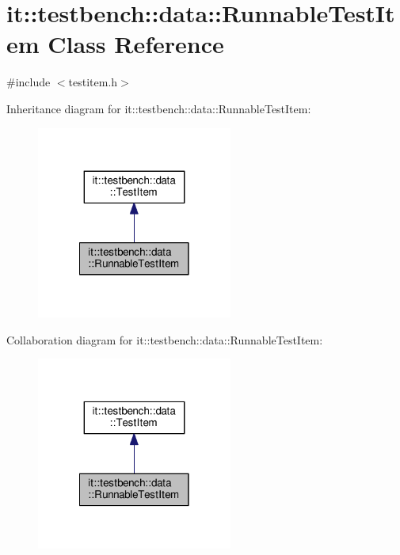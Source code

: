 \hypertarget{classit_1_1testbench_1_1data_1_1RunnableTestItem}{\section{it\-:\-:testbench\-:\-:data\-:\-:Runnable\-Test\-Item Class Reference}
\label{d0/df8/classit_1_1testbench_1_1data_1_1RunnableTestItem}
}


{\ttfamily \#include $<$testitem.\-h$>$}



Inheritance diagram for it\-:\-:testbench\-:\-:data\-:\-:Runnable\-Test\-Item\-:
\nopagebreak
\begin{figure}[H]
\begin{center}
\leavevmode
\includegraphics[width=182pt]{d1/d92/classit_1_1testbench_1_1data_1_1RunnableTestItem__inherit__graph}
\end{center}
\end{figure}


Collaboration diagram for it\-:\-:testbench\-:\-:data\-:\-:Runnable\-Test\-Item\-:
\nopagebreak
\begin{figure}[H]
\begin{center}
\leavevmode
\includegraphics[width=182pt]{d3/dfb/classit_1_1testbench_1_1data_1_1RunnableTestItem__coll__graph}
\end{center}
\end{figure}
